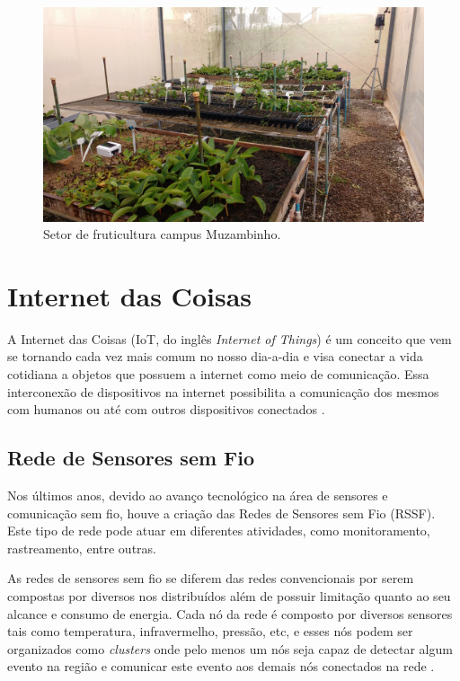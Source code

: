 \begin{figure}[H]
    \centering
    \includegraphics[scale=0.1]{04-figuras/fruticultura.jpg}
    \caption{Setor de fruticultura campus Muzambinho.}
    \vspace{-\baselineskip}
    \label{fig:fruticultura}
\end{figure}


\section{Internet das Coisas}
A Internet das Coisas (IoT, do inglês \textit{Internet of Things}) é um conceito que vem se tornando cada vez mais comum no nosso dia-a-dia e visa conectar a vida cotidiana a objetos que possuem a internet como meio de comunicação. Essa interconexão de dispositivos na internet possibilita a comunicação dos mesmos com humanos ou até com outros dispositivos conectados \cite{leandro2017}.

\subsection{Rede de Sensores sem Fio}
Nos últimos anos, devido ao avanço tecnológico na área de sensores e comunicação sem fio, houve a criação das Redes de Sensores sem Fio (RSSF). Este tipo de rede pode atuar em diferentes atividades, como monitoramento, rastreamento, entre outras.

As redes de sensores sem fio se diferem das redes convencionais por serem compostas por diversos nos distribuídos além de possuir limitação quanto ao seu alcance e consumo de energia. Cada nó da rede é composto por diversos sensores tais como temperatura, infravermelho, pressão, etc, e esses nós podem ser organizados como \textit{clusters} onde pelo menos um nós seja capaz de detectar algum evento na região e comunicar este evento aos demais nós conectados na rede \cite{loureiro2003redes}.

